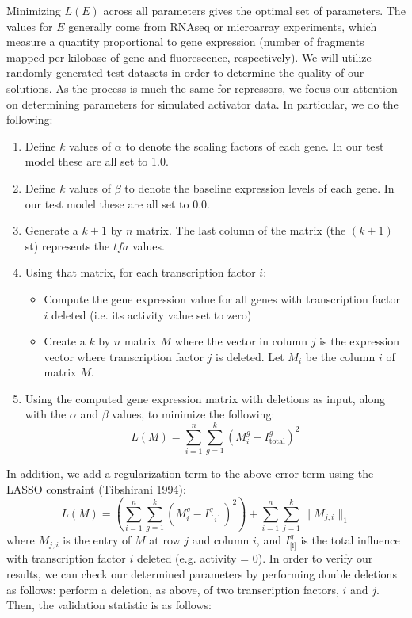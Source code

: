 \documentclass[paper=a4, fontsize=11pt]{scrartcl} %
\newcommand{\tfa}{\textit{tfa}}
\begin{document}
Minimizing $L(E)$ across all parameters gives the optimal set of parameters. The values for $E$ generally come from RNAseq or microarray experiments, which measure a quantity proportional to gene expression (number of fragments mapped per kilobase of gene and fluorescence, respectively). We will utilize randomly-generated test datasets in order to determine the quality of our solutions.
\newline\newline
As the process is much the same for repressors, we focus our attention on determining parameters for simulated activator data. In particular, we do the following:
\begin{enumerate}
\item Define $k$ values of $\alpha$ to denote the scaling factors of each gene. In our test model these are all set to 1.0.
\item Define $k$ values of $\beta$ to denote the baseline expression levels of each gene. In our test model these are all set to 0.0.
\item Generate a $k+1$ by $n$ matrix. The last column of the matrix (the $(k+1)$st) represents the $\tfa$ values.
\item Using that matrix, for each transcription factor $i$:
	\begin{itemize}
	\item Compute the gene expression value for all genes with transcription factor $i$ deleted (i.e. its activity value set to zero)
	\item Create a $k$ by $n$ matrix $M$ where the vector in column $j$ is the expression vector where transcription factor $j$ is deleted. Let $M_i$ be the column $i$ of matrix $M$.
	\end{itemize}
\item Using the computed gene expression matrix with deletions as input, along with the $\alpha$ and $\beta$ values, to minimize the following:
\[L(M) = \sum_{i=1}^{n}{\sum_{g=1}^{k}{\left(M_i^g - I_{\text{total}}^g\right)^2}} \]
\end{enumerate}
In addition, we add a regularization term to the above error term using the LASSO constraint (Tibshirani 1994):
\[L(M) = \left(\sum_{i=1}^{n}{\sum_{g=1}^{k}{\left(M_i^g - I_{[i]}^g\right)^2}}\right) + \sum_{i=1}^{n}{\sum_{j=1}^{k}{\lVert M_{j,i} \rVert_1}} \]
where $M_{j,i}$ is the entry of $M$ at row $j$ and column $i$, and $I_{\text{[i]}}^g$ is the total influence with transcription factor $i$ deleted (e.g. activity = 0).
\newline\newline
In order to verify our results, we can check our determined parameters by performing double deletions as follows: perform a deletion, as above, of two transcription factors, $i$ and $j$. Then, the validation statistic is as follows:
\end{document}
